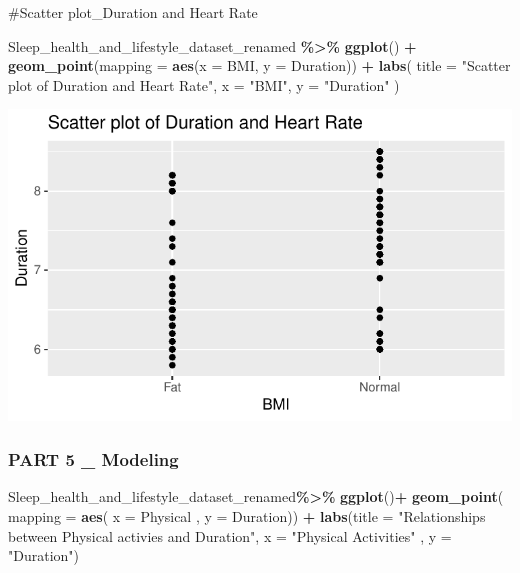\documentclass[
  11pt,
]{article}
\newenvironment{Shaded}{\begin{snugshade}}{\end{snugshade}}
\newcommand{\AttributeTok}[1]{\textcolor[rgb]{0.13,0.29,0.53}{#1}}
\newcommand{\FunctionTok}[1]{\textcolor[rgb]{0.13,0.29,0.53}{\textbf{#1}}}
\newcommand{\NormalTok}[1]{#1}
\newcommand{\SpecialCharTok}[1]{\textcolor[rgb]{0.81,0.36,0.00}{\textbf{#1}}}
\newcommand{\StringTok}[1]{\textcolor[rgb]{0.31,0.60,0.02}{#1}}
\begin{document}
\#Scatter plot\_Duration and Heart Rate

\begin{Shaded}
\begin{Highlighting}[]
\NormalTok{Sleep\_health\_and\_lifestyle\_dataset\_renamed    }\SpecialCharTok{\%\textgreater{}\%} 
\FunctionTok{ggplot}\NormalTok{()    }\SpecialCharTok{+}
\FunctionTok{geom\_point}\NormalTok{(}\AttributeTok{mapping =} \FunctionTok{aes}\NormalTok{(}\AttributeTok{x =}\NormalTok{ BMI, }\AttributeTok{y =}\NormalTok{ Duration))    }\SpecialCharTok{+} 
\FunctionTok{labs}\NormalTok{(}
\AttributeTok{title =} \StringTok{"Scatter plot of Duration and Heart Rate"}\NormalTok{, }
\AttributeTok{x =} \StringTok{"BMI"}\NormalTok{,}
\AttributeTok{y =} \StringTok{"Duration"} 
\NormalTok{)}
\end{Highlighting}
\end{Shaded}

\begin{center}\includegraphics[width=0.7\linewidth]{SleepHelath_files/figure-latex/unnamed-chunk-46-1} \end{center}

\hypertarget{part-5-_-modeling}{%
\subsubsection{PART 5 \_ Modeling}\label{part-5-_-modeling}}

\begin{Shaded}
\begin{Highlighting}[]
\NormalTok{Sleep\_health\_and\_lifestyle\_dataset\_renamed}\SpecialCharTok{\%\textgreater{}\%}
  \FunctionTok{ggplot}\NormalTok{()}\SpecialCharTok{+}
  \FunctionTok{geom\_point}\NormalTok{( }\AttributeTok{mapping =} \FunctionTok{aes}\NormalTok{( }\AttributeTok{x  =}\NormalTok{ Physical , }\AttributeTok{y =}\NormalTok{ Duration)) }\SpecialCharTok{+}
  \FunctionTok{labs}\NormalTok{(}\AttributeTok{title =} \StringTok{"Relationships between Physical activies and Duration"}\NormalTok{,}
       \AttributeTok{x =} \StringTok{"Physical Activities"}\NormalTok{ , }\AttributeTok{y =} \StringTok{"Duration"}\NormalTok{)}
\end{Highlighting}
\end{Shaded}
\end{document}
